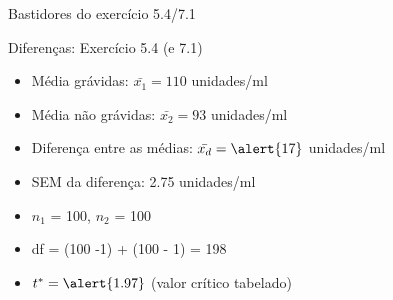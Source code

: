 \documentclass{beamer}
\begin{document}

\begin{frame}{{\small Bastidores do exercício 5.4/7.1}}
  \begin{exampleblock}{Diferenças: Exercício 5.4 (e 7.1)}
    \begin{exampleblock}{}
      \begin{itemize}
      \item {\scriptsize Média grávidas: $\bar{x_1} = 110$ unidades/ml}
      \item {\scriptsize Média não grávidas: $\bar{x_2} = 93$ unidades/ml}
      \item Diferença entre as médias: $\bar{x_d} = \alert{17}$ unidades/ml
      \end{itemize}
    \end{exampleblock}
    \begin{exampleblock}{}
      \begin{itemize}
      \item SEM da diferença: \alert{2.75} unidades/ml
      \end{itemize}
    \end{exampleblock}
    \begin{exampleblock}{}
      \begin{itemize}
      \item {\scriptsize $n_1$ = 100, $n_2$ = 100}
      \item df = (100 -1) + (100 - 1) = \alert{198}
      \end{itemize}
    \end{exampleblock}
    \begin{exampleblock}{}
      \begin{itemize}
      \item $t^{*} = \alert{1.97}$ {\tiny(valor crítico tabelado)}
      \end{itemize}
    \end{exampleblock}
  \end{exampleblock}
\end{frame}
\end{document}
